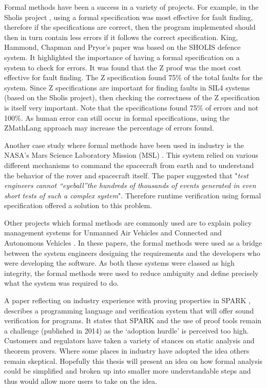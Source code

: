 Formal methods have been a success in a variety of projects. For example, in the
Sholis project \cite{sholis}, using a formal specification was most effective
for fault finding, therefore if the specifications are correct, then the program
implemented should then in turn contain less errors if it follows the correct
specification. King, Hammond, Chapman and Pryor's paper \cite{sholis} was based
on the SHOLIS defence system. It highlighted the importance of having a formal
specification on a system to check for errors. It was found that the Z proof was
the most cost effective for fault finding. The Z specification found 75\% of the
total faults for the system. Since Z specifications are important for finding
faults in SIL4 systems (based on the Sholis project), then checking the
correctness of the Z specification is itself very important. Note that the
specifications found 75\% of errors and not 100\%. As human error can still
occur in formal specifications, using the ZMathLang approach may increase the
percentage of errors found.

Another case study where formal methods have been used in industry is the NASA’s
Mars Science Laboratory Mission (MSL) \cite{DBLP:journals/corr/abs-1003-1682}.
This system relied on various different mechanisms to command the spacecraft
from earth and to understand the behavior of the rover and spacecraft itself.
The paper suggested that "\textit{test engineers cannot “eyeball”the hundreds of
thousands of events generated in even short tests of such a complex system}".
Therefore runtime verification using formal specification offered a solution to
this problem.

Other projects which formal methods are commonly used are to explain policy
management systems for Unmanned Air Vehicles \cite{agreemenetpatternsuav} and
Connected and Autonomous Vehicles \cite{agreemenetpatternscav}. In these papers,
the formal methods were used as a bridge between the system engineers designing
the requirements and the developers who were developing the software. As both
these systems were classed as high integrity, the formal methods were used to
reduce ambiguity and define precisely what the system was required to do.

A paper reflecting on industry experience with proving properties in SPARK
\cite{DBLP:conf/itp/ChapmanS14}, describes a programming language and
verification system that will offer sound verification for programs. It states
that SPARK and the use of proof tools remain a challenge (published in 2014) as
the `adoption hurdle' is perceived too high. Customers and regulators have taken
a variety of stances on static analysis and theorem provers. Where some places
in industry have adopted the idea others remain skeptical. Hopefully this thesis
will present an idea on how formal analysis could be simplified and broken up
into smaller more understandable steps and thus would allow more users to take
on the idea.

